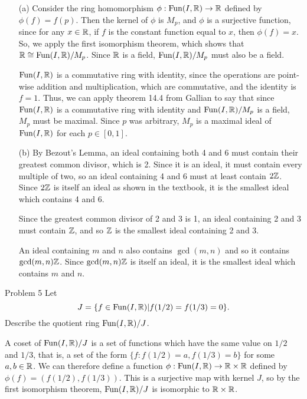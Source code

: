 \documentclass{hmwk}
\begin{document}
\begin{solution}
\begin{itemize}
    \item[(a)] Consider the ring homomorphism $\phi: \mathrm{Fun}(I, \mathbb{R}) \rightarrow \mathbb{R}$ defined by $\phi(f) = f(p)$. Then the kernel of $\phi$ is $M_p$, and $\phi$ is a surjective function, since for any $x \in \mathbb{R}$, if $f$ is the constant function equal to $x$, then $\phi(f) = x$. So, we apply the first isomorphism theorem, which shows that $\mathbb{R} \cong \mathrm{Fun}(I, \mathbb{R})/M_p$. Since $\mathbb{R}$ is a field, $\mathrm{Fun}(I, \mathbb{R})/M_p$ must also be a field.

    $\mathrm{Fun}(I, \mathbb{R})$ is a commutative ring with identity, since the operations are point-wise addition and multiplication, which are commutative, and the identity is $f = 1$. Thus, we can apply theorem 14.4 from Gallian to say that since $\mathrm{Fun}(I, \mathbb{R})$ is a commutative ring with identity and $\mathrm{Fun}(I, \mathbb{R})/M_p$ is a field, $M_p$ must be maximal. Since $p$ was arbitrary, $M_p$ is a maximal ideal of $\mathrm{Fun}(I, \mathbb{R})$ for each $p \in [0, 1]$. 

    \item[(b)] By Bezout's Lemma, an ideal containing both 4 and 6 must contain their greatest common divisor, which is 2. Since it is an ideal, it must contain every multiple of two, so an ideal containing 4 and 6 must at least contain $2\mathbb{Z}$. Since $2\mathbb{Z}$ is itself an ideal as shown in the textbook, it is the smallest ideal which contains 4 and 6. 
    
    Since the greatest common divisor of 2 and 3 is 1, an ideal containing 2 and 3 must contain $\mathbb{Z}$, and so $\mathbb{Z}$ is the smallest ideal containing 2 and 3. 

    An ideal containing $m$ and $n$ also contains $\gcd(m, n)$ and so it contains $\gcd(m, n)\mathbb{Z}$. Since $\gcd(m, n)\mathbb{Z}$ is itself an ideal, it is the smallest ideal which contains $m$ and $n$. 
\end{itemize}
\end{solution}

\begin{problem}{Problem 5}
Let \[J = \{ f \in \mathrm{Fun}(I,\mathbb{R}) | f(1/2) = f(1/3) = 0\} .\] Describe the quotient ring $\mathrm{Fun}(I,\mathbb{R})/J$.
\end{problem}

\begin{solution}
    
    
    \pre A coset of $\mathrm{Fun}(I, \mathbb{R})/J$ is a set of functions which have the same value on $1/2$ and $1/3$, that is, a set of the form $\{f: f(1/2) = a, f(1/3) = b\}$ for some $a, b \in \mathbb{R}$. We can therefore define a function $\phi: \mathrm{Fun}(I, \mathbb{R}) \rightarrow \mathbb{R} \times \mathbb{R}$ defined by $\phi(f) = (f(1/2), f(1/3))$. This is a surjective map with kernel $J$, so by the first isomorphism theorem, $\mathrm{Fun}(I, \mathbb{R})/J$  is isomorphic to $\mathbb{R} \times \mathbb{R}$.
\end{solution}
\end{document}
